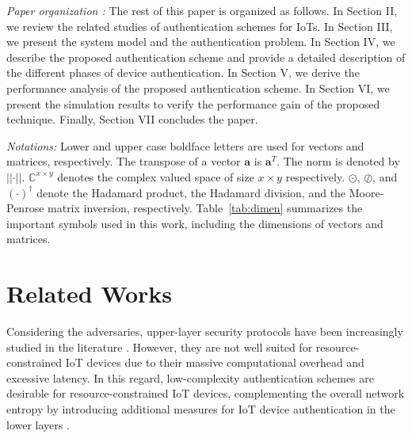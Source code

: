 \documentclass[journal,10pt]{IEEEtran}
\begin{document}
\textit{Paper organization :} The rest of this paper is organized as follows. In Section II, we review the related studies of authentication schemes for IoTs. In Section III, we present the system model and the authentication problem. In Section IV, we describe the proposed authentication scheme and provide a detailed description of the different phases of device authentication. In Section V, we derive the performance analysis of the proposed authentication scheme. In Section VI, we present the simulation results to verify the performance gain of the proposed technique. Finally, Section VII concludes the paper.


\textit{Notations:} Lower and upper case boldface letters are used for vectors and matrices, respectively. The transpose of a vector $\mathbf{a}$ is $\mathbf{a}^T$.  The norm is denoted by $\left|\left| \cdot \right|\right|$. $\mathbb{C}^{x \times y}$ denotes the complex valued space of size $x \times y$ respectively. $\odot$, $\oslash$, and $(\cdot)^\dagger$ denote the Hadamard product, the Hadamard division, and the Moore-Penrose matrix inversion, respectively. Table~\ref{tab:dimen} summarizes the important symbols used in this work, including the dimensions of vectors and matrices.


\section{Related Works}
Considering the adversaries, upper-layer security protocols have been increasingly studied in the literature \cite{lin2017survey, weber2010internet}. However, they are not well suited for resource-constrained IoT devices due to their massive computational overhead and excessive latency. In this regard, low-complexity authentication schemes are desirable for resource-constrained IoT devices, complementing the overall network entropy by introducing additional measures for IoT device authentication in the lower layers \cite{wang2016physical, paul2008physical}. 
\end{document}
